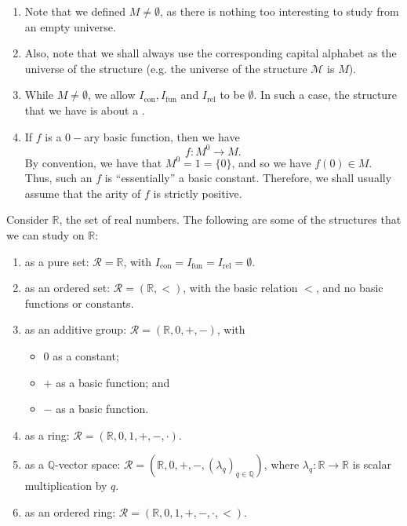 \documentclass[notoc,notitlepage]{tufte-book}
\DeclareMathOperator{\con}{con}
\DeclareMathOperator{\fun}{fun}
\DeclareMathOperator{\rel}{rel}
\begin{document}
\begin{note}
  \begin{enumerate}
    \item Note that we defined $M \neq \emptyset$, as there is nothing too interesting to study from an empty universe.
    \item Also, note that we shall always use the corresponding capital alphabet as the universe of the structure (e.g. the universe of the structure $\mathcal{M}$ is $M$).
    \item While $M \neq \emptyset$, we allow $I_{\con}, I_{\fun}$ and $I_{\rel}$ to be $\emptyset$. In such a case, the structure that we have is about a .
    \item If $f$ is a $0-$ary basic function, then we have
      \begin{equation*}
        f : M^0 \to M.
      \end{equation*}
      By convention, we have that $M^0 = 1 = \{ 0 \}$, and so we have $f(0) \in M$. Thus, such an $f$ is ``essentially'' a basic constant. Therefore, we shall usually assume that the arity of $f$ is strictly positive.
  \end{enumerate}
\end{note}

\begin{eg}
  Consider $\mathbb{R}$, the set of real numbers. The following are some of the structures that we can study on $\mathbb{R}$:
  \begin{enumerate}
    \item as a pure set: $\mathcal{R} = \mathbb{R}$, with $I_{\con} = I_{\fun} = I_{\rel} = \emptyset$.
    \item as an ordered set: $\mathcal{R} = (\mathbb{R}, <)$, with the basic  relation $<$, and no basic functions or constants.
    \item as an additive group: $\mathcal{R} = (\mathbb{R}, 0, +, -)$, with
      \begin{itemize}
        \item $0$ as a constant;
        \item $+$ as a basic  function; and
        \item $-$ as a basic  function.
      \end{itemize}

    \item as a ring: $\mathcal{R} = (\mathbb{R}, 0, 1, +, -, \cdot)$.
    \item as a $\mathbb{Q}$-vector space: $\mathcal{R} = (\mathbb{R}, 0, +, -, (\lambda_q)_{q \in \mathbb{Q}})$, where $\lambda_q : \mathbb{R} \to \mathbb{R}$ is scalar multiplication by $q$.
    \item as an ordered ring: $\mathcal{R} = ( \mathbb{R}, 0, 1, +, -, \cdot, < )$.
  \end{enumerate}
\end{eg}
\end{document}
